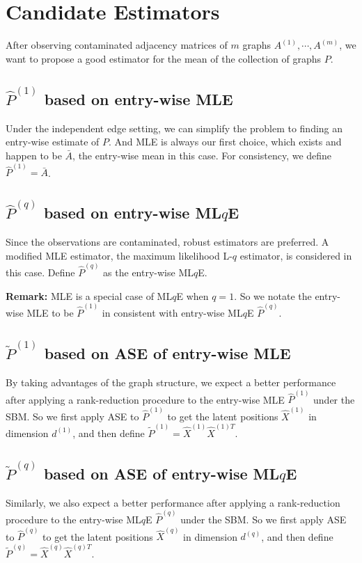 \documentclass[a4paper]{article}
\begin{document}
\section{Candidate Estimators}

After observing contaminated adjacency matrices of $m$ graphs $A^{(1)}, \cdots, A^{(m)}$, we want to propose a good estimator for the mean of the collection of graphs $P$.

\subsection{$\hat{P}^{(1)}$ based on entry-wise MLE}
Under the independent edge setting, we can simplify the problem to finding an entry-wise estimate of $P$. And MLE is always our first choice, which exists and happen to be $\bar{A}$, the entry-wise mean in this case. For consistency, we define $\hat{P}^{(1)} = \bar{A}$.


\subsection{$\hat{P}^{(q)}$ based on entry-wise ML$q$E}
Since the observations are contaminated, robust estimators are preferred. A modified MLE estimator, the maximum likelihood L-$q$ estimator, is considered in this case. Define $\hat{P}^{(q)}$ as the entry-wise ML$q$E.

\noindent \textbf{Remark:} MLE is a special case of ML$q$E when $q = 1$. So we notate the entry-wise MLE to be $\hat{P}^{(1)}$ in consistent with entry-wise ML$q$E $\hat{P}^{(q)}$.


\subsection{$\widetilde{P}^{(1)}$ based on ASE of entry-wise MLE}
By taking advantages of the graph structure, we expect a better performance after applying a rank-reduction procedure to the entry-wise MLE $\hat{P}^{(1)}$ under the SBM. So we first apply ASE to $\hat{P}^{(1)}$ to get the latent positions $\hat{X}^{(1)}$ in dimension $d^{(1)}$, and then define $\widetilde{P}^{(1)} = \hat{X}^{(1)} \hat{X}^{{(1)}T}$.



\subsection{$\widetilde{P}^{(q)}$ based on ASE of entry-wise ML$q$E}
Similarly, we also expect a better performance after applying a rank-reduction procedure to the entry-wise ML$q$E $\hat{P}^{(q)}$ under the SBM. So we first apply ASE to $\hat{P}^{(q)}$ to get the latent positions $\hat{X}^{(q)}$ in dimension $d^{(q)}$, and then define $\widetilde{P}^{(q)} = \hat{X}^{(q)} \hat{X}^{{(q)}T}$.
\end{document}
